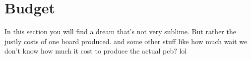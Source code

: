 \section{Budget}
In this section you will find a dream that's not very sublime.
But rather the justly costs of one board produced.
and some other stuff
like how much wait we don't know how much it cost to produce the actual pcb?
lol
